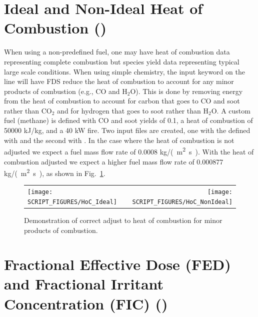 \documentclass[11pt]{book}
\begin{document}
\clearpage

\section{Ideal and Non-Ideal Heat of Combustion ()}
\label{HoC}
\label{HoC_Ideal}
\label{HoC_NonIdeal}

When using a non-predefined fuel, one may have heat of combustion data representing complete combustion but species yield data representing typical large scale conditions.  When using simple chemistry, the input keyword  on the  line will have FDS reduce the heat of combustion to account for any minor products of combustion (e.g., CO and H$_2$O).  This is done by removing energy from the heat of combustion to account for carbon that goes to CO and soot rather than CO$_2$ and for hydrogen that goes to soot rather than H$_2$O.  A custom fuel (methane) is defined with CO and soot yields of 0.1, a heat of combustion of 50000 kJ/kg, and a 40 kW fire.  Two input files are created, one with the  defined with  and the second with .  In the  case where the heat of combustion is not adjusted we expect a fuel mass flow rate of 0.0008 \si{kg/(m^2.s)}.  With the heat of combustion adjusted we expect a higher fuel mass flow rate of 0.000877 \si{kg/(m^2.s)}, as shown in Fig.~\ref{fig:HoC}.
\begin{figure}[h!]
\begin{tabular*}{\textwidth}{lr}
\texttt{[image: SCRIPT\_FIGURES/HoC\_Ideal]} &
\texttt{[image: SCRIPT\_FIGURES/HoC\_NonIdeal]}
\end{tabular*}
\caption[ and  test cases]{Demonstration of correct adjust to heat of combustion for minor products of combustion.}
\label{fig:HoC}
\end{figure}

\clearpage


\section{Fractional Effective Dose (FED) and Fractional Irritant Concentration (FIC) (\texorpdfstring{}{FED\_FIC}) }
\label{FED_FIC}
\label{FED_FIC_SMIX}
\end{document}
